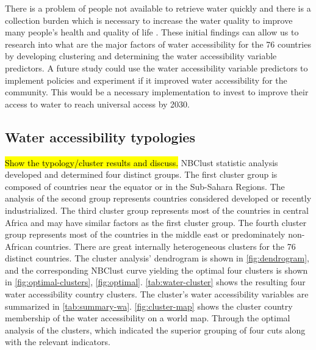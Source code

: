 \documentclass[10pt,twoside]{article}
\numberwithin{equation}{section}
\newcommand{\?}{\stackrel{?}{=}}
\begin{document}
There is a problem of people not available to retrieve water quickly and there is a collection burden which is necessary to increase the water quality to improve many people's health and quality of life \citep{cassiviAccessDrinkingWater2018}. These initial findings can allow us to research into what are the major factors of water accessibility for the 76 countries by developing clustering and determining the water accessibility variable predictors. A future study could use the water accessibility variable predictors to implement policies and experiment if it improved water accessibility for the community. This would be a necessary implementation to invest to improve their access to water to reach universal access by 2030.



\subsection{Water accessibility typologies}

\hl{Show the typology/cluster results and discuss.}
NBClust statistic analysis developed and determined four distinct groups. The first cluster group is composed of countries near the equator or in the Sub-Sahara Regions. The analysis of the second group represents countries considered developed or recently industrialized. The third cluster group represents most of the countries in central Africa and may have similar factors as the first cluster group. The fourth cluster group represents most of the countries in the middle east or predominately non-African countries. There are great internally heterogeneous clusters for the 76 distinct countries. The cluster analysis' dendrogram is shown in \autoref{fig:dendrogram}, and the corresponding NBClust curve yielding the optimal four clusters is shown in \autoref{fig:optimal-clusters}, \autoref{fig:optimal}. \autoref{tab:water-cluster} shows the resulting four water accessibility country clusters. The cluster's water accessibility variables are summarized in \autoref{tab:summary-wa}. \autoref{fig:cluster-map} shows the cluster country membership of the water accessibility on a world map.  Through the optimal analysis of the clusters, which indicated the superior grouping of four cuts along with the relevant indicators. 
\end{document}
